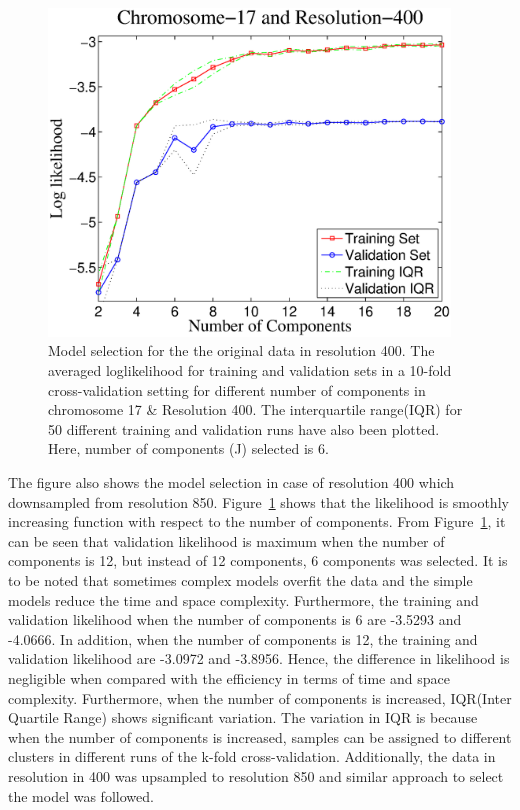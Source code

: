 \begin{figure}[h!]
\centering
\includegraphics[width=0.95\textwidth]{figures/chr17dm400lat}
\caption[Model selection in chromosome 17 and resolution 400]{Model selection for the the original data in resolution 400. The averaged loglikelihood for training and validation sets in a 10-fold cross-validation setting for different number of components in chromosome 17 \& Resolution 400. The interquartile range(IQR) for 50 different training and validation runs have also been plotted. Here, number of components (J) selected is 6.}\label{Fig:chr17dm393}
\end{figure}

The figure also shows the model selection in case of resolution 400 which downsampled from resolution 850. Figure~\ref{Fig:chr17dm393} shows that the likelihood is smoothly increasing function with respect to the number of components. From Figure~\ref{Fig:chr17dm393}, it can be seen that validation likelihood is maximum when the number of components is 12, but instead of 12 components, 6 components was selected. It is to be noted that sometimes complex models overfit the data and the simple models reduce the time and space complexity. Furthermore, the training and validation likelihood when the number of components is 6 are -3.5293 and -4.0666. In addition, when the number of components is 12, the training and validation likelihood are -3.0972 and -3.8956. Hence, the difference in likelihood is negligible when compared with the efficiency in terms of time and space complexity. Furthermore, when the number of components is increased, IQR(Inter Quartile Range) shows significant variation. The variation in IQR is because when the number of components is increased, samples can be assigned to different clusters in different runs of the k-fold cross-validation. Additionally, the data in resolution in 400 was upsampled to resolution 850 and similar approach to select the model was followed. 

